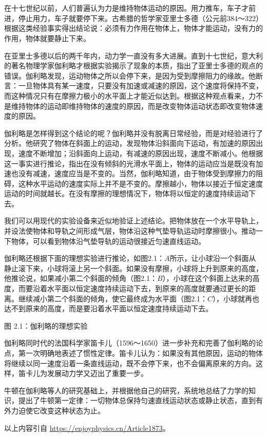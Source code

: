 \chapter[质点运动学与动力学]{}
\begin{prove}
    在十七世纪以前，人们普遍认为力是维持物体运动的原因。用力推车，车子才前进，停止用力，车子就要停下来。古希腊的哲学家亚里士多德（公元前384～322）根据这类经验事实得出结论说：必须有力作用在物体上，物体才能运动，没有力的作用，物体就要静止下来。

    在亚里士多德以后的两千年内，动力学一直没有多大进展。直到十七世纪，意大利的著名物理学家伽利略才根据实验揭示了现象的本质，指出了亚里士多德的观点的错误。伽利略发现，运动物体之所以会停下来，是因为受到摩擦阻力的缘故。他断言：一旦物体具有某一速度，只要没有加速或减速的原因，这个速度将保持不变，而这种情况只有在摩擦力极小的水平面上才能近似达到。根据这种观点看来，力不是维持物体的运动即维持物体的速度的原因，而是改变物体运动状态即改变物体速度的原因。
    
    伽利略是怎样得到这个结论的呢？伽利略并没有脱离日常经验，而是对经验进行了分析。他研究了物体在斜面上的运动，发现物体沿斜面向下运动，有加速的原因出现，速度不断增加；沿斜面向上运动，有减速的原因出现，速度不断减小。他根据这一事实进行推论，指出在没有倾斜的光滑水平面上，物体的运动应当是既没有加速也没有减速，速度应当是不变的。当然，伽利略知道，由于物体受到摩擦力的阻碍，这种水平运动的速度实际上并不是不变的。摩擦越小，物体以接近于恒定速度运动的时间就越长。在没有摩擦的理想情况下，物体将以恒定的速度持续运动下去。
    
    我们可以用现代的实验设备来近似地验证上述结论。把物体放在一个水平导轨上，并设法使物体和导轨之间形成气层，物体沿这种气垫导轨运动时摩擦很小。推动一下物体，可以看到物体沿气垫导轨的运动很接近匀速直线运动。
    
    伽利略还根据下面的理想实验进行推论，如图2.1：$A$所示，让小球沿一个斜面从静止滚下来，小球将滚上另一个斜面。如果没有摩擦，小球将上升到原来的高度，他推论说，如果减小第二个斜面的倾角（图2.1：$B$），小球在这个斜面上达来的高度，而要沿着水平面以恒定速度持续运动下去，到原来的高度就要通过更长的距离。继续减小第二个斜面的倾角，使它最终成为水平面（图2.1：$C$），小球就再也达不到原来的高度，而是要沿着水平面以恒定速度持续运动下去。
    
	\begin{center}
		图 2.1：伽利略的理想实验
	\end{center}
    伽利略同时代的法国科学家笛卡儿（1596～1650）进一步补充和完善了伽利略的论点，第一次明确地表述了惯性定律。笛卡儿认为：如果没有其他原因，运动的物体将继续以同一速度沿着一条直线运动，既不会停下来，也不会偏离原来的方向。这样，笛卡儿为发展动力学又迈出了重要一步。
    
    牛顿在伽利略等人的研究基础上，并根据他自己的研究，系统地总结了力学的知识，提出了牛顿第一定律：一切物体总保持匀速直线运动状态或静止状态，直到有外力迫使它改变这种状态为止。
    
    以上内容引自 \url{https://enjoyphysics.cn/Article1873}。
\end{prove}

